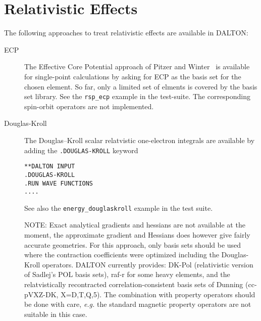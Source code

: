 \chapter{\label{chap:Relativity}Relativistic Effects}

The following approaches to treat relativistic effects are available in DALTON:

\begin{description}

\item[ECP]
The Effective Core Potential approach of Pitzer and
Winter~\cite{rmpnmwijqc40} is available for single-point calculations
by asking for ECP as the basis set for the chosen element. So far,
only a limited set of elments is covered by the basis set library. See
the \verb|rsp_ecp| example in the test-suite. The corresponding spin-orbit
operators are not implemented.

\begin{center}
\end{center}


\item[Douglas-Kroll] The Douglas--Kroll scalar relatvistic one-electron integrals  
are available by adding the \verb|.DOUGLAS-KROLL|   keyword
\begin{verbatim}
**DALTON INPUT
.DOUGLAS-KROLL
.RUN WAVE FUNCTIONS
....
\end{verbatim}

See also the \verb|energy_douglaskroll| example in the test suite.

  NOTE: Exact analytical gradients and hessians are not available 
at the moment, the approximate gradient and Hessians does however give fairly accurate geometries.  For this approach, only basis sets should be used 
where the contraction coefficients were optimized including the Douglas-Kroll 
operators. DALTON currently provides:  DK-Pol (relativistic version of Sadlej's POL basis sets), raf-r for some heavy elements, and the relatvistically recontracted correlation-consistent basis sets of Dunning (cc-pVXZ-DK, X=D,T,Q,5). The combination with 
property operators should be done with care, {\it e.g.\/} the standard
magnetic property operators are not suitable in this case.


\end{description}
